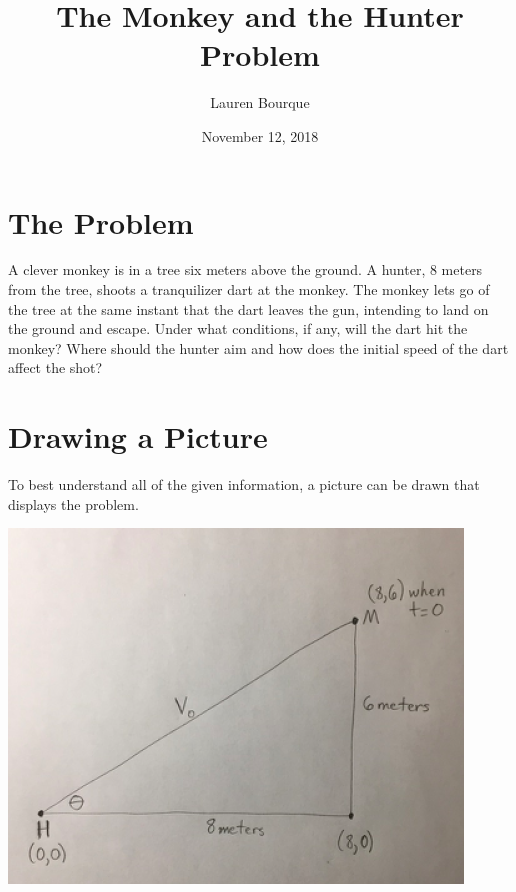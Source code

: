 \documentclass[12pt]{article}
\title{The Monkey and the Hunter Problem}
\author{Lauren Bourque }
\date{November 12, 2018}
\begin{document}
\maketitle

\section{The Problem}
A clever monkey is in a tree six meters above the ground. A hunter, 8 meters from the tree, shoots a tranquilizer dart at the monkey. The monkey lets go of the tree at the same instant that the dart leaves the gun, intending to land on the ground and escape. Under what conditions, if any, will the dart hit the monkey? Where should the hunter aim and how does the initial speed of the dart affect the shot?
\section{Drawing a Picture}
To best understand all of the given information, a picture can be drawn that displays the problem.\\
\begin{center}
\includegraphics[scale=0.5]{picture}
\end{center}
\end{document}
